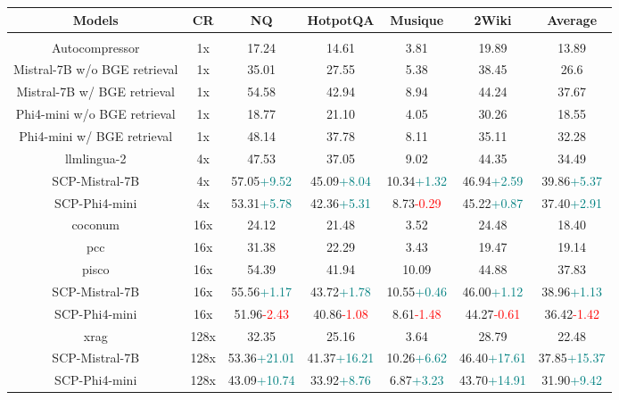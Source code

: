 \documentclass{applemlr}
\numberwithin{equation}{section}
\begin{document}
\begin{table}[!t]
\footnotesize
\centering
\begin{tabular}{ccccccc}
\bottomrule
Models & CR & NQ & HotpotQA & Musique & 2Wiki & Average \\
\hline
\rowcolor{gray!15}
\multicolumn{7}{c}{\textbf{Normal}} \\
\hline
Autocompressor & 1x & 17.24 & 14.61 & 3.81 & 19.89 & 13.89 \\
Mistral-7B w/o BGE retrieval & 1x & 35.01 & 27.55 & 5.38 & 38.45 & 26.6 \\
Mistral-7B w/ BGE retrieval & 1x & 54.58 & 42.94 & 8.94 & 44.24 & 37.67 \\
Phi4-mini w/o BGE retrieval & 1x & 18.77 & 21.10 & 4.05 & 30.26 & 18.55 \\
Phi4-mini w/ BGE retrieval & 1x & 48.14 & 37.78 & 8.11 & 35.11 & 32.28 \\
\hline 

llmlingua-2 & 4x & 47.53 & 37.05 & 9.02 & 44.35 & 34.49 \\
SCP-Mistral-7B & 4x & 57.05\tiny\textcolor{teal}{+9.52} & 45.09\tiny\textcolor{teal}{+8.04} & 10.34\tiny\textcolor{teal}{+1.32} & 46.94\tiny\textcolor{teal}{+2.59} & 39.86\tiny\textcolor{teal}{+5.37} \\
SCP-Phi4-mini & 4x & 53.31\tiny\textcolor{teal}{+5.78} & 42.36\tiny\textcolor{teal}{+5.31} & 8.73\tiny\textcolor{red}{-0.29} & 45.22\tiny\textcolor{teal}{+0.87} & 37.40\tiny\textcolor{teal}{+2.91} \\
\hline 

coconum & 16x & 24.12 & 21.48 & 3.52 & 24.48 & 18.40 \\
pcc & 16x & 31.38 & 22.29 & 3.43 & 19.47 & 19.14 \\
pisco & 16x & 54.39 & 41.94 & 10.09 & 44.88 & 37.83 \\
SCP-Mistral-7B& 16x & 55.56\tiny\textcolor{teal}{+1.17} & 43.72\tiny\textcolor{teal}{+1.78} & 10.55\tiny\textcolor{teal}{+0.46} & 46.00\tiny\textcolor{teal}{+1.12} & 38.96\tiny\textcolor{teal}{+1.13} \\
SCP-Phi4-mini& 16x & 51.96\tiny\textcolor{red}{-2.43} & 40.86\tiny\textcolor{red}{-1.08} & 8.61\tiny\textcolor{red}{-1.48} & 44.27\tiny\textcolor{red}{-0.61} & 36.42\tiny\textcolor{red}{-1.42} \\

\hline 
xrag & 128x & 32.35 & 25.16 & 3.64 & 28.79 & 22.48 \\
SCP-Mistral-7B& 128x & 53.36\tiny\textcolor{teal}{+21.01} & 41.37\tiny\textcolor{teal}{+16.21} & 10.26\tiny\textcolor{teal}{+6.62} & 46.40\tiny\textcolor{teal}{+17.61} & 37.85\tiny\textcolor{teal}{+15.37} \\
SCP-Phi4-mini & 128x & 43.09\tiny\textcolor{teal}{+10.74} & 33.92\tiny\textcolor{teal}{+8.76} & 6.87\tiny\textcolor{teal}{+3.23} & 43.70\tiny\textcolor{teal}{+14.91} & 31.90\tiny\textcolor{teal}{+9.42} \\


\end{tabular}
\end{table}
\end{document}
